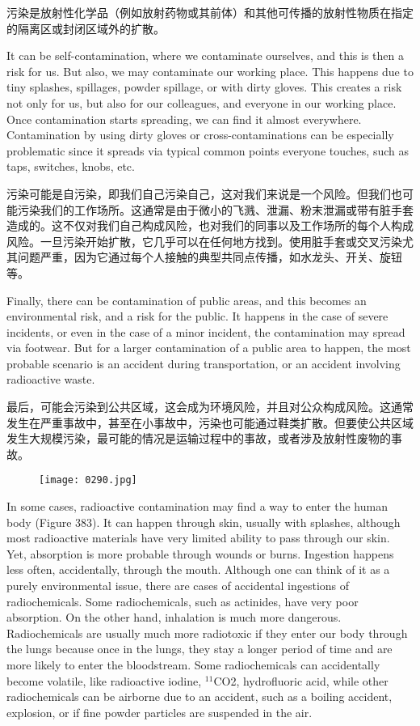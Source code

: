 \documentclass[dvipsnames, svgnames,a4paper,11pt]{article}
\begin{document}
污染是放射性化学品（例如放射药物或其前体）和其他可传播的放射性物质在指定的隔离区或封闭区域外的扩散。

It can be self-contamination, where we contaminate ourselves, and this is then a risk for us. But also, we may contaminate our working place. This happens due to tiny splashes, spillages, powder spillage, or with dirty gloves. This creates a risk not only for us, but also for our colleagues, and everyone in our working place. Once contamination starts spreading, we can find it almost everywhere. Contamination by using dirty gloves or cross-contaminations can be especially problematic since it spreads via typical common points everyone touches, such as taps, switches, knobs, etc.

污染可能是自污染，即我们自己污染自己，这对我们来说是一个风险。但我们也可能污染我们的工作场所。这通常是由于微小的飞溅、泄漏、粉末泄漏或带有脏手套造成的。这不仅对我们自己构成风险，也对我们的同事以及工作场所的每个人构成风险。一旦污染开始扩散，它几乎可以在任何地方找到。使用脏手套或交叉污染尤其问题严重，因为它通过每个人接触的典型共同点传播，如水龙头、开关、旋钮等。

Finally, there can be contamination of public areas, and this becomes an environmental risk, and a risk for the public. It happens in the case of severe incidents, or even in the case of a minor incident, the contamination may spread via footwear. But for a larger contamination of a public area to happen, the most probable scenario is an accident during transportation, or an accident involving radioactive waste.


最后，可能会污染到公共区域，这会成为环境风险，并且对公众构成风险。这通常发生在严重事故中，甚至在小事故中，污染也可能通过鞋类扩散。但要使公共区域发生大规模污染，最可能的情况是运输过程中的事故，或者涉及放射性废物的事故。


\begin{figure}[h]
    \centering
    \texttt{[image: 0290.jpg]} 
     \label{fig383}
\end{figure}

In some cases, radioactive contamination may find a way to enter the human body (Figure 383). It can happen through skin, usually with splashes, although most radioactive materials have very limited ability to pass through our skin. Yet, absorption is more probable through wounds or burns. Ingestion happens less often, accidentally, through the mouth. Although one can think of it as a purely environmental issue, there are cases of accidental ingestions of radiochemicals. Some radiochemicals, such as actinides, have very poor absorption. On the other hand, inhalation is much more dangerous. Radiochemicals are usually much more radiotoxic if they enter our body through the lungs because once in the lungs, they stay a longer period of time and are more likely to enter the bloodstream. Some radiochemicals can accidentally become volatile, like radioactive iodine, \(\mathrm{^{11}C}\)O2, hydrofluoric acid, while other radiochemicals can be airborne due to an accident, such as a boiling accident, explosion, or if fine powder particles are suspended in the air.
\end{document}
